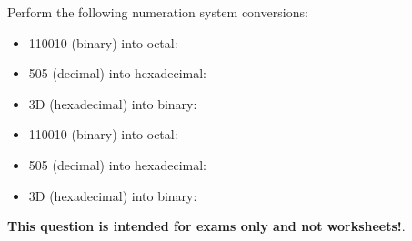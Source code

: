 

Perform the following numeration system conversions:

\begin{itemize}
\item{} 110010 (binary) into octal: \underbar{\hskip 50pt}
\vskip 10pt
\item{} 505 (decimal) into hexadecimal: \underbar{\hskip 50pt}
\vskip 10pt
\item{} 3D (hexadecimal) into binary: \underbar{\hskip 50pt}
\end{itemize}







\begin{itemize}
\item{} 110010 (binary) into octal: 
\vskip 10pt
\item{} 505 (decimal) into hexadecimal: 
\vskip 10pt
\item{} 3D (hexadecimal) into binary: 
\end{itemize}







{\bf This question is intended for exams only and not worksheets!}.


